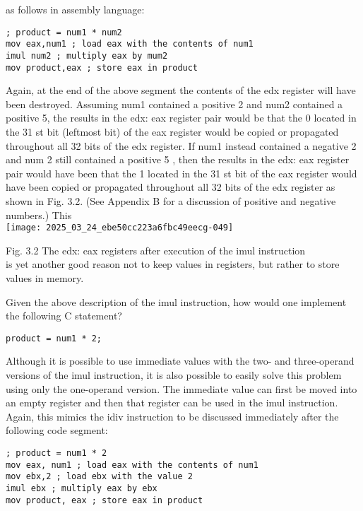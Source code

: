 \documentclass[10pt]{article}
\begin{document}
as follows in assembly language:

\begin{verbatim}
; product = num1 * num2
mov eax,num1 ; load eax with the contents of num1
imul num2 ; multiply eax by mum2
mov product,eax ; store eax in product
\end{verbatim}

Again, at the end of the above segment the contents of the edx register will have been destroyed. Assuming num1 contained a positive 2 and num2 contained a positive 5, the results in the edx: eax register pair would be that the 0 located in the 31 st bit (leftmost bit) of the eax register would be copied or propagated throughout all 32 bits of the edx register. If num1 instead contained a negative 2 and num 2 still contained a positive 5 , then the results in the edx: eax register pair would have been that the 1 located in the 31 st bit of the eax register would have been copied or propagated throughout all 32 bits of the edx register as shown in Fig. 3.2. (See Appendix B for a discussion of positive and negative numbers.) This\\
\texttt{[image: 2025\_03\_24\_ebe50cc223a6fbc49eecg-049]}

Fig. 3.2 The edx: eax registers after execution of the imul instruction\\
is yet another good reason not to keep values in registers, but rather to store values in memory.

Given the above description of the imul instruction, how would one implement the following C statement?

\begin{verbatim}
product = num1 * 2;
\end{verbatim}

Although it is possible to use immediate values with the two- and three-operand versions of the imul instruction, it is also possible to easily solve this problem using only the one-operand version. The immediate value can first be moved into an empty register and then that register can be used in the imul instruction. Again, this mimics the idiv instruction to be discussed immediately after the following code segment:

\begin{verbatim}
; product = num1 * 2
mov eax, num1 ; load eax with the contents of num1
mov ebx,2 ; load ebx with the value 2
imul ebx ; multiply eax by ebx
mov product, eax ; store eax in product
\end{verbatim}
\end{document}

